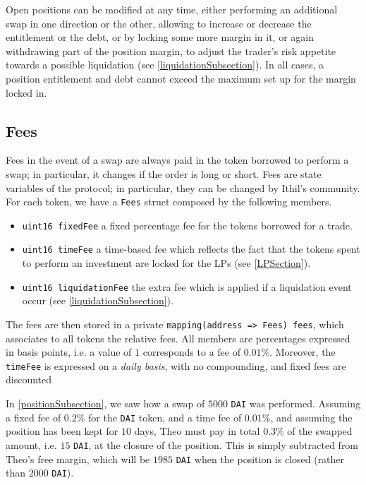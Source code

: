 \documentclass [10pt, fancyhdr, twoside] {article}
\begin{document}
Open positions can be modified at any time, either performing an additional swap in one direction or the other, allowing to increase or decrease the entitlement or the debt, or by locking some more margin in it, or again withdrawing part of the position margin, to adjust the trader's risk appetite towards a possible liquidation (see \ref{liquidationSubsection}). In all cases, a position entitlement and debt cannot exceed the maximum set up for the margin locked in. 

\subsection{Fees}\label{feeSubsection}

Fees in the event of a swap are always paid in the token borrowed to perform a swap; in particular, it changes if the order is long or short.
Fees are state variables of the protocol; in particular, they can be changed by Ithil's community. For each token, we have a \verb|Fees| struct composed by the following members.
\begin{itemize}
\item \verb|uint16 fixedFee| a fixed percentage fee for the tokens borrowed for a trade.
\item \verb|uint16 timeFee| a time-based fee which reflects the fact that the tokens spent to perform an investment are locked for the LPs (see \ref{LPSection}).
\item \verb|uint16 liquidationFee| the extra fee which is applied if a liquidation event occur (see \ref{liquidationSubsection}).
\end{itemize}

The fees are then stored in a private \verb|mapping(address => Fees) fees|, which associates to all tokens the relative fees. All members are percentages expressed in basis points, i.e. a value of $1$ corresponds to a fee of $0.01$\%. Moreover, the \verb|timeFee| is expressed on a \textit{daily basis}, with no compounding, and fixed fees are discounted 

In \ref{positionSubsection}, we saw how a swap of $5000$ \verb|DAI| was performed. Assuming a fixed fee of $0.2$\% for the \verb|DAI| token, and a time fee of $0.01$\%, and assuming the position has been kept for $10$ days, Theo must pay in total $0.3$\% of the swapped amount, i.e. $15$ \verb|DAI|, at the closure of the position. This is simply subtracted from Theo's free margin, which will be $1985$ \verb|DAI| when the position is closed (rather than $2000$ \verb|DAI|).
\end{document}
